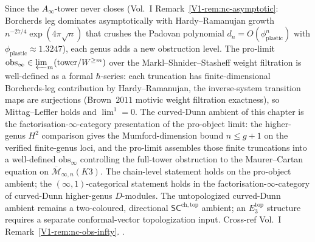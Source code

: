 \begin{remark}
\label{rem:cdhg-obs-infty}
Since the $A_\infty$-tower never closes (Vol.~I
Remark~\ref{V1-rem:nc-asymptotic}: Borcherds leg dominates
asymptotically with Hardy--Ramanujan growth $n^{-27/4}\exp(4\pi\sqrt n)$
that crushes the Padovan polynomial $d_n = O(\phi_{\mathrm{plastic}}^{n})$
with $\phi_{\mathrm{plastic}} \approx 1.3247$), each genus adds a new
obstruction level. The pro-limit
$\mathrm{obs}_\infty \in \varprojlim_{m}(\mathrm{tower}/W^{\ge m})$
over the Markl--Shnider--Stasheff weight filtration is well-defined
as a formal $\hbar$-series: each truncation has finite-dimensional
Borcherds-leg contribution by Hardy--Ramanujan, the inverse-system
transition maps are surjections (Brown~$2011$ motivic weight
filtration exactness), so Mittag--Leffler holds and $\lim^1 = 0$.
The curved-Dunn ambient of this chapter is the factorisation-$\infty$-category
presentation of the pro-object limit: the higher-genus
$H^2$ comparison gives the Mumford-dimension bound $n \le g+1$ on the
verified finite-genus loci, and the pro-limit assembles those finite
truncations into a well-defined
$\mathrm{obs}_\infty$ controlling the full-tower obstruction to the
Maurer--Cartan equation on $\overline{\mathcal M}_{\infty,n}(K3)$.
The chain-level statement holds on the pro-object ambient; the
$(\infty,1)$-categorical statement holds in the
factorisation-$\infty$-category of curved-Dunn higher-genus
$D$-modules. The untopologized curved-Dunn ambient remains a
two-coloured, directional $\mathsf{SC}^{\mathrm{ch,top}}$ ambient; an
$E_3^{\mathrm{top}}$ structure requires a separate conformal-vector
topologization input. Cross-ref Vol.~I
Remark~\ref{V1-rem:nc-obs-infty}.
\cite{Brown2011,Deligne2013,MarklShniderStasheff2002,
 HardyRamanujan1918,GritsenkoNikulin1998,BeilinsonBloch2005}.
\end{remark}

